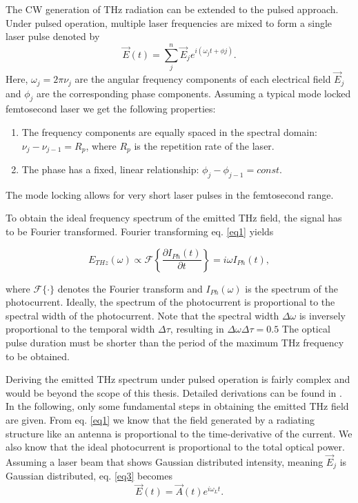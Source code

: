 The CW generation of THz radiation can be extended to the pulsed approach. Under pulsed operation, multiple laser frequencies are mixed to form a single laser pulse denoted by 
\begin{equation}
	\vec{E}(t) = \sum_j^n \vec{E}_je^{i(\omega_j t + \phi j)}.
\label{eq3}
\end{equation}
Here, $\omega_j = 2 \pi \nu_j$ are the angular frequency components of each electrical field $\vec{E}_j$ and $\phi_j$ are the corresponding phase components. Assuming a typical mode locked femtosecond laser we get the following properties: 
\renewcommand{\labelenumi}{\alph{enumi})}
\begin{enumerate}
	\item The frequency components are equally spaced in the spectral domain: $\nu_j - \nu_{j-1} = R_p$, where $R_p$ is the repetition rate of the laser.
	\item The phase has a fixed, linear relationship: $\phi_j - \phi_{j-1} = const.$
\end{enumerate}

The mode locking allows for very short laser pulses in the femtosecond range.

To obtain the ideal frequency spectrum of the emitted THz field, the signal has to be Fourier transformed. Fourier transforming eq. \eqref{eq1} yields

\begin{equation}
	E_{THz}(\omega) \propto \mathcal{F}\left\{ \frac{\partial I_{Ph}(t)}{\partial t} \right\} = i\omega I_{Ph}(t), 
\end{equation}

where $\mathcal{F}\{\cdot \}$ denotes the Fourier transform and $I_{Ph}(\omega)$ is the spectrum of the photocurrent. Ideally, the spectrum of the photocurrent is proportional to the spectral width of the photocurrent. Note that the spectral width $\Delta \omega$ is inversely proportional to the temporal width $\Delta \tau$, resulting in $\Delta \omega \Delta \tau = 0.5$ The optical pulse duration must be shorter than the period of the maximum THz frequency to be obtained. 

Deriving the emitted THz spectrum under pulsed operation is fairly complex and would be beyond the scope of this thesis. Detailed derivations can be found in \cite{preuPrinciplesTHzGeneration2015}. In the following, only some fundamental steps in obtaining the emitted THz field are given. From eq. \eqref{eq1} we know that the field generated by a radiating structure like an antenna is proportional to the time-derivative of the current. We also know that the ideal photocurrent is proportional to the total optical power. Assuming a laser beam that shows Gaussian distributed intensity, meaning $\vec{E}_j$ is Gaussian distributed, eq. \eqref{eq3} becomes
\begin{equation}
	\vec{E}(t) = \vec{A}(t)e^{i\omega_Lt}.
\label{eq4} 
\end{equation}

